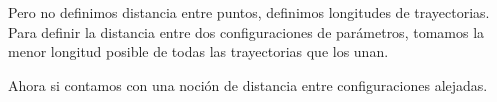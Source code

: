 Pero no definimos distancia entre puntos, definimos longitudes de trayectorias. Para definir la distancia entre dos configuraciones de par\'ametros, tomamos la menor longitud posible de todas las trayectorias que los unan. 

Ahora si contamos con una noci\'on de distancia entre configuraciones alejadas.